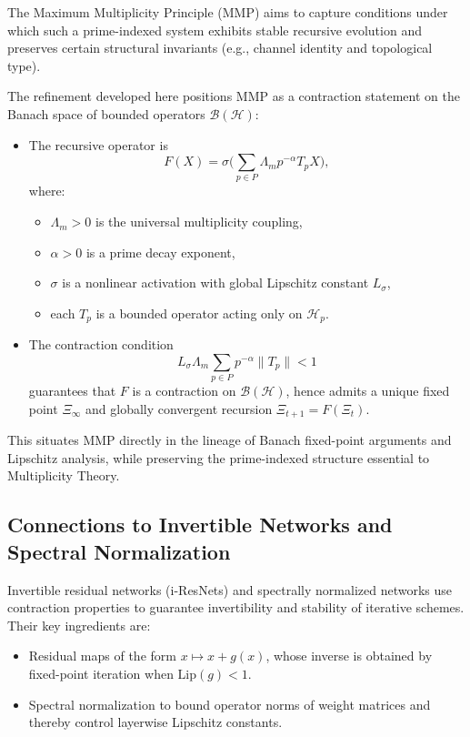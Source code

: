 \documentclass[12pt]{article}
\begin{document}
The Maximum Multiplicity Principle (MMP) aims to capture conditions under which such a prime-indexed system exhibits stable recursive evolution and preserves certain structural invariants (e.g., channel identity and topological type).

The refinement developed here positions MMP as a contraction statement on the Banach space of bounded operators \(\mathcal{B}(\mathcal{H})\):

\begin{itemize}
  \item The recursive operator is
  \[
    F(X) = \sigma\!\Big(\sum_{p\in P} \Lambda_m p^{-\alpha} T_p X \Big),
  \]
  where:
  \begin{itemize}
    \item \(\Lambda_m>0\) is the universal multiplicity coupling,
    \item \(\alpha>0\) is a prime decay exponent,
    \item \(\sigma\) is a nonlinear activation with global Lipschitz constant \(L_\sigma\),
    \item each \(T_p\) is a bounded operator acting only on \(\mathcal{H}_p\).
  \end{itemize}
  \item The contraction condition
  \[
    L_\sigma \Lambda_m \sum_{p\in P} p^{-\alpha}\|T_p\| < 1
  \]
  guarantees that \(F\) is a contraction on \(\mathcal{B}(\mathcal{H})\), hence admits a unique fixed point \(\Xi_\infty\) and globally convergent recursion \(\Xi_{t+1}=F(\Xi_t)\).
\end{itemize}

This situates MMP directly in the lineage of Banach fixed-point arguments and Lipschitz analysis, while preserving the prime-indexed structure essential to Multiplicity Theory.

\subsection{Connections to Invertible Networks and Spectral Normalization}

Invertible residual networks (i-ResNets) and spectrally normalized networks use contraction properties to guarantee invertibility and stability of iterative schemes. Their key ingredients are:

\begin{itemize}
  \item Residual maps of the form \(x \mapsto x + g(x)\), whose inverse is obtained by fixed-point iteration when \(\mathrm{Lip}(g)<1\).
  \item Spectral normalization to bound operator norms of weight matrices and thereby control layerwise Lipschitz constants.
\end{itemize}
\end{document}
